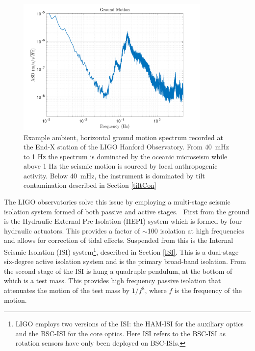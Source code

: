 \documentclass [12pt, proquest]{uwthesis}[2019]
\begin{document}
\begin{figure}[!h]
\begin{center}
\includegraphics[width=0.85\textwidth]{GroundSpectrum.pdf}
\caption[Example ambient ground motion spectrum]{Example ambient, horizontal ground motion spectrum recorded at the End-X station of the LIGO Hanford Observatory. From 40~mHz to 1 Hz the spectrum is dominated by the oceanic microseism while above 1 Hz the seismic motion is sourced by local anthropogenic activity. Below 40~mHz, the instrument is dominated by tilt contamination described in Section \ref{tiltCon}}
\label{groundSpec}
\end{center}
\end{figure}

The LIGO observatories solve this issue by employing a multi-stage seismic isolation system formed of both passive and active stages.~\cite{ligoSeis} First from the ground is the Hydraulic External Pre-Isolation (HEPI) system which is formed by four hydraulic actuators. This provides a factor of $\sim$100 isolation at high frequencies and allows for correction of tidal effects. Suspended from this is the Internal Seismic Isolation (ISI) system\footnote{LIGO employs two versions of the ISI: the HAM-ISI for the auxiliary optics and the BSC-ISI for the core optics. Here ISI refers to the BSC-ISI as rotation sensors have only been deployed on BSC-ISIs.}, described in Section \ref{ISI}. This is a dual-stage six-degree active isolation system and is the primary broad-band isolation. From the second stage of the ISI is hung a quadruple pendulum, at the bottom of which is a test mass. This provides high frequency passive isolation that attenuates the motion of the test mass by $1/f^8$, where $f$ is the frequency of the motion.
\end{document}
